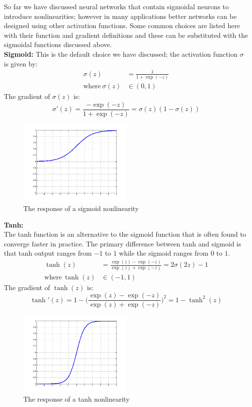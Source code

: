 So far we have discussed neural networks that contain sigmoidal neurons to introduce nonlinearities; however in many applications better networks can be designed using other activation functions. Some common choices are listed here with their function and gradient definitions and these can be substituted with the sigmoidal functions discussed above.\\
\textbf{Sigmoid:} This is the default choice we have discussed; the activation function $\sigma$ is given by:
\begin{align*}
  \sigma(z) &= \frac{1}{1 + \operatorname{exp}(-z)}\\
  \text{where}~\sigma(z) &\in (0, 1)
\end{align*}
The gradient of $ \sigma(z) $ is:
$$ \sigma'(z) = \frac{- \operatorname{exp}(-z)}{1 +  \operatorname{exp}(-z)} = \sigma(z) (1 - \sigma(z))$$
\begin{figure}[H]%
  \center%
    \includegraphics[width=0.5\textwidth]{images/eman/graph_sigmoid.png}
  \caption[The response of a sigmoid nonlinearity ]{The response of a sigmoid nonlinearity}
  \label{fig:graph_sigmoid}
\end{figure}
\textbf{Tanh:}\\ 
The tanh function is an alternative to the sigmoid function that is often found to converge faster in practice. The primary difference between tanh and sigmoid is that tanh output ranges from $-1$ to $1$ while the sigmoid ranges from $0$ to $1$.
\begin{align*}
  \operatorname{tanh}(z) &=  \frac{\operatorname{exp}(z) - \operatorname{exp}(-z)}{\operatorname{exp}(z) + \operatorname{exp}(-z)} = 2\sigma(2z) - 1\\
  \text{where}~\operatorname{tanh}(z) &\in (-1, 1)
\end{align*}
The gradient of $ \operatorname{tanh}(z) $ is:
$$ \operatorname{tanh}'(z) = 1 - \bigg(\frac{\operatorname{exp}(z) - \operatorname{exp}(-z)}{\operatorname{exp}(z) + \operatorname{exp}(-z)}\bigg)^2 = 1 - \operatorname{tanh}^2(z)$$
\begin{figure}[H]%
  \center%
    \includegraphics[width=0.5\textwidth]{images/eman/graph_tanh.png}
  \caption[The response of a tanh nonlinearity ]{The response of a tanh nonlinearity}
  \label{fig:graph_tanh}
\end{figure}
